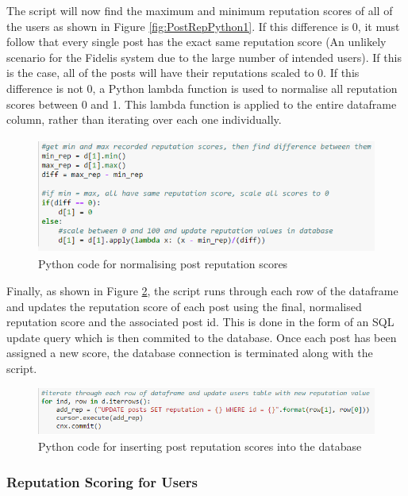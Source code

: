 The script will now find the maximum and minimum reputation scores of all of the users as shown in Figure \ref{fig:PostRepPython1}. If this difference is 0, it must follow that every single post has the exact same reputation score (An unlikely scenario for the Fidelis system due to the large number of intended users). If this is the case, all of the posts will have their reputations scaled to 0. If this difference is not 0, a Python lambda function is used to normalise all reputation scores between 0 and 1. This lambda function is applied to the entire dataframe column, rather than iterating over each one individually.

\begin{figure}[H]
\centering
\includegraphics[height=1.5in]{Images/Implementation/PostRepPython2}
\caption{Python code for normalising post reputation scores}
\label{fig:PostRepPython2}
\end{figure}

Finally, as shown in Figure \ref{fig:PostRepPython3}, the script runs through each row of the dataframe and updates the reputation score of each post using the final, normalised reputation score and the associated post id. This is done in the form of an SQL update query which is then commited to the database. Once each post has been assigned a new score, the database connection is terminated along with the script.

\begin{figure}[H]
\centering
\includegraphics[width=5in]{Images/Implementation/PostRepPython3}
\caption{Python code for inserting post reputation scores into the database}
\label{fig:PostRepPython3}
\end{figure}

\subsubsection{Reputation Scoring for Users}


